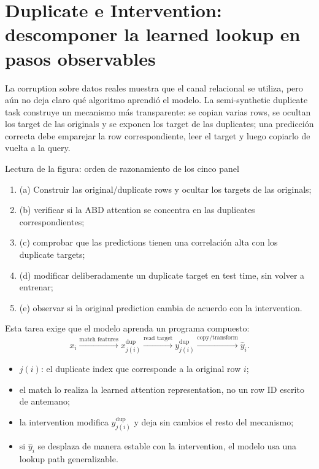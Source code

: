 \section{Duplicate e Intervention: descomponer la learned lookup en pasos observables}

La corruption sobre datos reales muestra que el canal relacional se utiliza, pero aún no deja claro qué algoritmo aprendió el modelo. La semi-synthetic duplicate task construye un mecanismo más transparente: se copian varias rows, se ocultan los target de las originals y se exponen los target de las duplicates; una predicción correcta debe emparejar la row correspondiente, leer el target y luego copiarlo de vuelta a la query.


\begin{knowledgebox}{Lectura de la figura: orden de razonamiento de los cinco panel}
\begin{enumerate}
  \item (a) Construir las original/duplicate rows y ocultar los targets de las originals;
  \item (b) verificar si la ABD attention se concentra en las duplicates correspondientes;
  \item (c) comprobar que las predictions tienen una correlación alta con los duplicate targets;
  \item (d) modificar deliberadamente un duplicate target en test time, sin volver a entrenar;
  \item (e) observar si la original prediction cambia de acuerdo con la intervention.
\end{enumerate}
\end{knowledgebox}

Esta tarea exige que el modelo aprenda un programa compuesto:
\[
x_i\xrightarrow{\text{match features}}
x_{j(i)}^{\mathrm{dup}}
\xrightarrow{\text{read target}}
y_{j(i)}^{\mathrm{dup}}
\xrightarrow{\text{copy/transform}}
\widehat y_i.
\]

\begin{itemize}
  \item $j(i)$: el duplicate index que corresponde a la original row $i$;
  \item el match lo realiza la learned attention representation, no un row ID escrito de antemano;
  \item la intervention modifica $y_{j(i)}^{\mathrm{dup}}$ y deja sin cambios el resto del mecanismo;
  \item si $\widehat y_i$ se desplaza de manera estable con la intervention, el modelo usa una lookup path generalizable.
\end{itemize}

